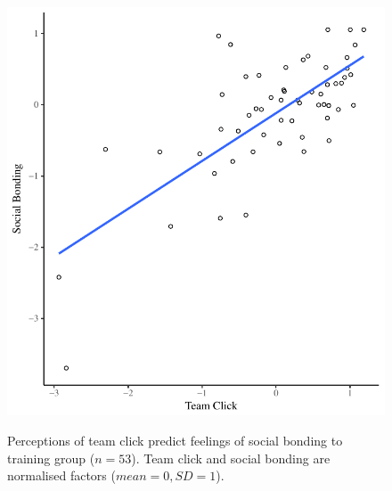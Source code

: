 

\begin{figure}
  \centering
    \includegraphics[width=0.5\linewidth,keepaspectratio] {images/groupClickBondScatter}
    \label{fig:groupClickBondScatter}
    \caption{Perceptions of team click predict feelings of social bonding to training group ($n = 53$).  Team click and social bonding are normalised factors ($mean = 0, SD = 1$).}
\end{figure}





